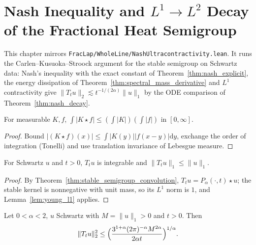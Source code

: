 \chapter{Nash Inequality and $L^1 \to L^2$ Decay of the Fractional Heat Semigroup}

This chapter mirrors \texttt{FracLap/WholeLine/NashUltracontractivity.lean}. It runs the Carlen--Kusuoka--Stroock argument for the stable semigroup on Schwartz data: Nash's inequality with the exact constant of Theorem~\ref{thm:nash_explicit}, the energy dissipation of Theorem~\ref{thm:spectral_mass_derivative} and $L^1$ contractivity give $\lVert T_t u\rVert_2 \lesssim t^{-1/(2\alpha)} \lVert u\rVert_1$ by the ODE comparison of Theorem~\ref{thm:nash_decay}.

\begin{lemma}\label{lem:young_l1}
\leanok
For measurable $K, f$, $\int \lvert K \star f\rvert \le (\int \lvert K\rvert)(\int \lvert f\rvert)$ in $[0, \infty]$.
\end{lemma}

\begin{proof}
\leanok
Bound $\lvert (K \star f)(x)\rvert \le \int \lvert K(y)\rvert\lvert f(x-y)\rvert \mathrm{d}y$, exchange the order of integration (Tonelli) and use translation invariance of Lebesgue measure.
\end{proof}

\begin{lemma}[$L^1$ contractivity]\label{lem:semigroup_l1_contractive}
\leanok
For Schwartz $u$ and $t > 0$, $T_t u$ is integrable and $\lVert T_t u\rVert_1 \le \lVert u\rVert_1$.
\end{lemma}

\begin{proof}
\leanok
By Theorem~\ref{thm:stable_semigroup_convolution}, $T_t u = P_\alpha(\cdot, t) \star u$; the stable kernel is nonnegative with unit mass, so its $L^1$ norm is $1$, and Lemma~\ref{lem:young_l1} applies.
\end{proof}

\begin{theorem}\label{thm:nash_l1_l2}
\leanok
Let $0 < \alpha < 2$, $u$ Schwartz with $M = \lVert u\rVert_1 > 0$ and $t > 0$. Then
\[
  \lVert T_t u\rVert_2^2 \le \Bigl(\frac{3^{1+\alpha}(2\pi)^{-\alpha} M^{2\alpha}}{2\alpha t}\Bigr)^{1/\alpha}.
\]
\end{theorem}

